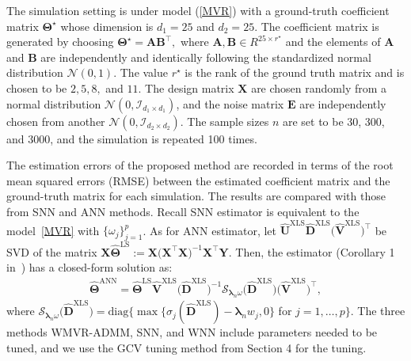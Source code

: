 \documentclass[alpha-refs]{wiley-article}
\begin{document}
The simulation setting is under model (\ref{MVR}) with a ground-truth coefficient matrix $\boldsymbol{\Theta}^{\star}$  whose dimension is $d_{1} = 25$ and $d_{2} = 25$.
The coefficient matrix is generated by choosing $\boldsymbol{\Theta}^{\star}  = \boldsymbol{A}\boldsymbol{B}^{\top},$ where $\boldsymbol{A}, \boldsymbol{B} \in R^{25 \times r^{\star}}$ and the elements of  $\boldsymbol{A}$ and $\boldsymbol{B}$ are independently and identically following the standardized normal distribution $\mathcal{N}(0, 1)$.
The value $r^{\star}$ is the rank of the ground truth matrix and is chosen to be $2, 5, 8,$ and $11$.
The design matrix $\boldsymbol{X}$ are chosen randomly from a normal distribution $\mathcal{N}(0, \mathcal{I}_{ d_{1} \times d_{1}})$, and the noise matrix $\boldsymbol{E}$ are independently chosen from another $\mathcal{N}(0, \mathcal{I}_{ d_{2} \times d_{2}})$.
The sample sizes $n$ are set to be 30, 300, and 3000, and the simulation is repeated 100 times.

The estimation errors of the proposed method are recorded in terms of the root mean squared errors (RMSE) between the estimated coefficient matrix and the ground-truth matrix for each simulation.
The results are compared with those from SNN and ANN methods.
Recall SNN estimator is equivalent to the model~\eqref{MVR} with $\{\omega_{j}\}_{j=1}^{p}$.
As for ANN estimator, let $\widehat{\boldsymbol{U}}^{\text{XLS}}\widehat{\boldsymbol{D}}^{\text{XLS}}\big(\widehat{\boldsymbol{V}}^{\text{XLS}}\big)^{\top}$ be SVD of the matrix $\boldsymbol{X}\widehat{\boldsymbol{\Theta}}^{\text{LS}}:=\boldsymbol{X}\big(\boldsymbol{X}^{\top}\boldsymbol{X}\big)^{-1}\boldsymbol{X}^{\top}\boldsymbol{Y}$.
Then, the estimator (Corollary 1 in~\citet{chen2013reduced}) has a closed-form solution as:
\begin{align}
    \widehat{\boldsymbol{\Theta}}^{\text{ANN}} = \widehat{\boldsymbol{\Theta}}^{\text{LS}}
    \widehat{\boldsymbol{V}}^{\text{XLS}} \big(\widehat{\boldsymbol{D}}^{\text{XLS}}\big)^{-1}
    \mathcal{S}_{\boldsymbol{\lambda}_{n}\omega}\big(\widehat{\boldsymbol{D}}^{\text{XLS}}\big)
    \big(\widehat{\boldsymbol{V}}^{\text{XLS}}\big)^{\top},
\end{align}
where $\mathcal{S}_{\boldsymbol{\lambda}_{n}\omega}\big(\widehat{\boldsymbol{D}}^{\text{XLS}}\big)=\text{diag}\bigg\{\max\bigg\{\sigma_{j}(\widehat{\boldsymbol{D}}^{\text{XLS}})-\boldsymbol{\lambda}_{n} w_{j},0 \bigg\}$ for $j=1,\dots,p\bigg\}$. The three methods WMVR-ADMM, SNN, and WNN include parameters needed to be tuned, and we use the GCV tuning method from Section 4 for the tuning.
\end{document}
